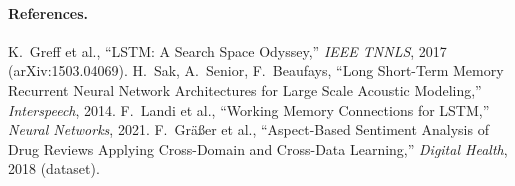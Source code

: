 \documentclass[10pt,a4paper]{article}
\begin{document}
\vspace{-0.3em}
\paragraph{References.}
{\small
K.~Greff et al., ``LSTM: A Search Space Odyssey,'' \emph{IEEE TNNLS}, 2017 (arXiv:1503.04069).
H.~Sak, A.~Senior, F.~Beaufays, ``Long Short-Term Memory Recurrent Neural Network Architectures for Large Scale
Acoustic Modeling,'' \emph{Interspeech}, 2014.
F.~Landi et al., ``Working Memory Connections for LSTM,'' \emph{Neural Networks}, 2021.
F.~Gr\"a{\ss}er et al., ``Aspect-Based Sentiment Analysis of Drug Reviews Applying Cross-Domain and Cross-Data
Learning,'' \emph{Digital Health}, 2018 (dataset).\par}
\end{document}
